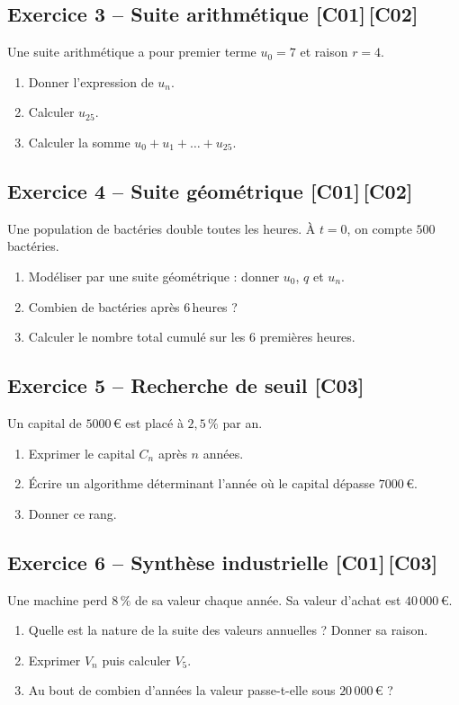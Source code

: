 \documentclass[a4paper,11pt]{article}
\begin{document}
\subsection*{Exercice 3 -- Suite arithmétique \hfill {\normalsize\color{uimmred}[C01]\,[C02]}}
Une suite arithmétique a pour premier terme $u_0 = 7$ et raison $r = 4$.
\begin{enumerate}[label=\alph*)]
  \item Donner l'expression de $u_n$.
  \item Calculer $u_{25}$.
  \item Calculer la somme $u_0 + u_1 + \dots + u_{25}$.
\end{enumerate}

\subsection*{Exercice 4 -- Suite géométrique \hfill {\normalsize\color{uimmred}[C01]\,[C02]}}
Une population de bactéries double toutes les heures. À $t = 0$, on compte $500$ bactéries.
\begin{enumerate}[label=\alph*)]
  \item Modéliser par une suite géométrique : donner $u_0$, $q$ et $u_n$.
  \item Combien de bactéries après $6$\,heures ?
  \item Calculer le nombre total cumulé sur les $6$ premières heures.
\end{enumerate}

\subsection*{Exercice 5 -- Recherche de seuil \hfill {\normalsize\color{uimmred}[C03]}}
Un capital de $5000\,$€ est placé à $2{,}5\,\%$ par an.
\begin{enumerate}[label=\alph*)]
  \item Exprimer le capital $C_n$ après $n$ années.
  \item Écrire un algorithme déterminant l'année où le capital dépasse $7000\,$€.
  \item Donner ce rang.
\end{enumerate}

\subsection*{Exercice 6 -- Synthèse industrielle \hfill {\normalsize\color{uimmred}[C01]\,[C03]}}
Une machine perd $8\,\%$ de sa valeur chaque année. Sa valeur d'achat est $40\,000\,$€.
\begin{enumerate}[label=\alph*)]
  \item Quelle est la nature de la suite des valeurs annuelles ? Donner sa raison.
  \item Exprimer $V_n$ puis calculer $V_5$.
  \item Au bout de combien d'années la valeur passe-t-elle sous $20\,000\,$€ ?
\end{enumerate}
\end{document}
